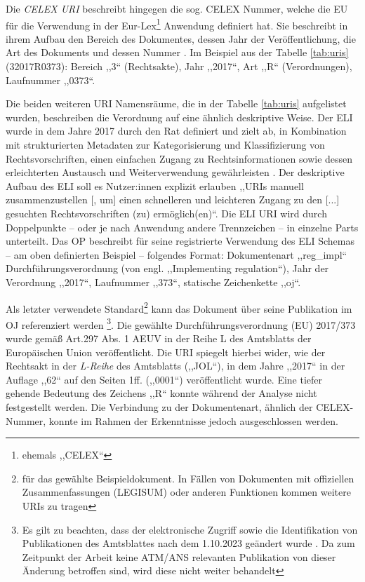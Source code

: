     \pagebreak
    \noindent
    Die \textit{CELEX URI} beschreibt hingegen die sog. CELEX Nummer, welche die \ac{EU} für die Verwendung in der Eur-Lex\footnote{ehemals ,,CELEX``} Anwendung definiert hat.
    Sie beschreibt in ihrem Aufbau den Bereich des Dokumentes, dessen Jahr der Veröffentlichung, die Art des Dokuments und dessen Nummer \cite[2, 24]{eu_celex}.
    Im Beispiel aus der Tabelle \ref{tab:uris} (32017R0373): Bereich ,,3`` (Rechtsakte), Jahr ,,2017``, Art ,,R`` (Verordnungen), Laufnummer ,,0373``.
    
    \medskip
    Die beiden weiteren URI Namensräume, die in der Tabelle \ref{tab:uris} aufgelistet wurden, beschreiben die Verordnung auf eine ähnlich deskriptive Weise.
    Der \acf{ELI} wurde in dem Jahre 2017 durch den Rat definiert und zielt ab, in Kombination mit strukturierten Metadaten zur Kategorisierung und Klassifizierung von Rechtsvorschriften, einen einfachen Zugang zu Rechtsinformationen sowie dessen erleichterten Austausch und Weiterverwendung gewährleisten \cite[Art. 5]{52017XG1222}.
    Der deskriptive Aufbau des \ac{ELI} soll es Nutzer:innen explizit erlauben ,,\acp{URI} manuell zusammenzustellen [, um] einen schnelleren und leichteren Zugang zu den [...] gesuchten Rechtsvorschriften (zu) ermöglich(en)``\cite[Art. 6c]{52017XG1222}.
    Die \ac{ELI} \ac{URI} wird durch Doppelpunkte -- oder je nach Anwendung andere Trennzeichen -- in einzelne Parts unterteilt.
    Das \acf{OP} beschreibt für seine registrierte Verwendung des ELI Schemas -- am oben definierten Beispiel -- folgendes Format: 
    Dokumentenart ,,reg\_impl`` Durchführungsverordnung (von engl. ,,Implementing regulation``), Jahr der Verordnung ,,2017``,  Laufnummer ,,373``, statische Zeichenkette ,,oj``. \cite[vgl.][]{eu_op_eli_register}
    
    \medskip
    Als letzter verwendete Standard\footnote{für das gewählte Beispieldokument. In Fällen von Dokumenten mit offiziellen Zusammenfassungen (LEGISUM) oder anderen Funktionen kommen weitere \acp{URI} zu tragen} kann das Dokument über seine Publikation im \acf{OJ} referenziert werden \footnote{Es gilt zu beachten, dass der elektronische Zugriff sowie die Identifikation von Publikationen des Amtsblattes nach dem 1.10.2023 geändert wurde \cite[siehe][]{eu_oj_actbyact}. Da zum Zeitpunkt der Arbeit keine ATM/ANS relevanten Publikation von dieser Änderung betroffen sind, wird diese nicht weiter behandelt}.
    Die gewählte Durchführungsverordnung (\ac{EU}) 2017/373 wurde gemäß Art.297 Abs. 1 \ac{AEUV} in der Reihe L des Amtsblatts der Europäischen Union veröffentlicht. 
    Die \ac{URI} spiegelt hierbei wider, wie der Rechtsakt in der \textit{L-Reihe} des Amtsblatts (,,JOL``), in dem Jahre ,,2017`` in der Auflage ,,62`` auf den Seiten 1ff. (,,0001``) veröffentlicht wurde.
    Eine tiefer gehende Bedeutung des Zeichens ,,R`` konnte während der Analyse nicht festgestellt werden.
    Die Verbindung zu der Dokumentenart, ähnlich der CELEX-Nummer, konnte im Rahmen der Erkenntnisse jedoch ausgeschlossen werden. 
    
